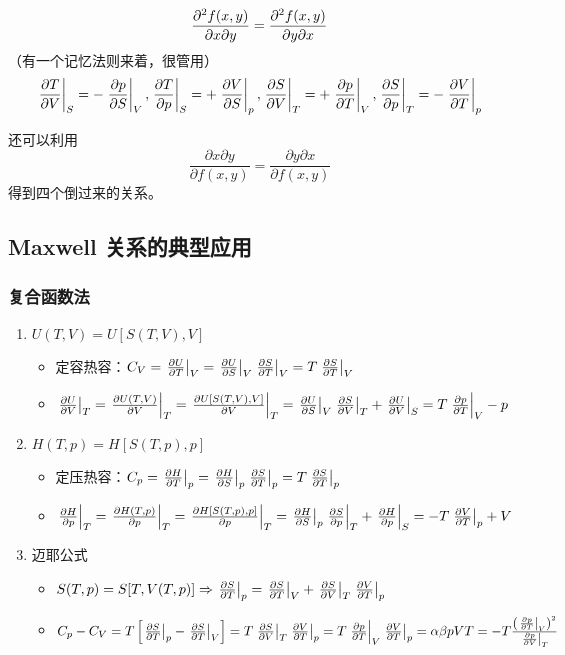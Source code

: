 \[
\pdv{f(x, y)}{x}{y} = \pdv{f(x, y)}{y}{x}
\]（有一个记忆法则来着，很管用）\[
\left.\pdv{T}{V}\right|_S = - \left.\pdv{p}{S}\right|_V, \left.\pdv{T}{p}\right|_S = + \left.\pdv{V}{S}\right|_p, \left.\pdv{S}{V}\right|_T = + \left.\pdv{p}{T}\right|_V, \left.\pdv{S}{p}\right|_T = - \left.\pdv{V}{T}\right|_p
\]

还可以利用\[
\frac{\partial x \partial y}{\partial f(x, y)} = \frac{\partial y \partial x}{\partial f(x, y)}
\]得到四个倒过来的关系。

\subsection{Maxwell 关系的典型应用}

\subsubsection{复合函数法}

\begin{enumerate}
    \item $U(T, V) = U[S(T, V), V]$\begin{itemize}
        \item 定容热容：$C_V = \left.\pdv{U}{T}\right|_V = \left.\pdv{U}{S}\right|_V \left.\pdv{S}{T}\right|_V = T \left.\pdv{S}{T}\right|_V$
        \item $\left.\pdv{U}{V}\right|_T = \left.\pdv{U(T, V)}{V}\right|_T = \left.\pdv{U[S(T, V), V]}{V}\right|_T = \left.\pdv{U}{S}\right|_V \left.\pdv{S}{V}\right|_T + \left.\pdv{U}{V}\right|_S = T \left.\pdv{p}{T}\right|_V - p$
    \end{itemize}
    \item $H(T, p) = H[S(T, p), p]$\begin{itemize}
        \item 定压热容：$C_p = \left.\pdv{H}{T}\right|_p = \left.\pdv{H}{S}\right|_p \left.\pdv{S}{T}\right|_p = T \left.\pdv{S}{T}\right|_p$
        \item $\left.\pdv{H}{p}\right|_T = \left.\pdv{H(T, p)}{p}\right|_T = \left.\pdv{H[S(T, p), p]}{p}\right|_T = \left.\pdv{H}{S}\right|_p \left.\pdv{S}{p}\right|_T + \left.\pdv{H}{p}\right|_S = - T \left.\pdv{V}{T}\right|_p + V$
    \end{itemize}
    \item 迈耶公式\begin{itemize}
        \item $S(T, p) = S[T, V(T, p)] \Rightarrow \left.\pdv{S}{T}\right|_p = \left.\pdv{S}{T}\right|_V + \left.\pdv{S}{V}\right|_T \left.\pdv{V}{T}\right|_p$
        \item $C_p - C_V = T \left[\left.\pdv{S}{T}\right|_p - \left.\pdv{S}{T}\right|_V\right] = T \left.\pdv{S}{V}\right|_T \left.\pdv{V}{T}\right|_p = T \left.\pdv{p}{T}\right|_V \left.\pdv{V}{T}\right|_p = \alpha \beta p V T = - T \frac{\left(\left.\pdv{p}{T}\right|_V\right)^2}{\left.\pdv{p}{V}\right|_T}$
    \end{itemize}
\end{enumerate}

